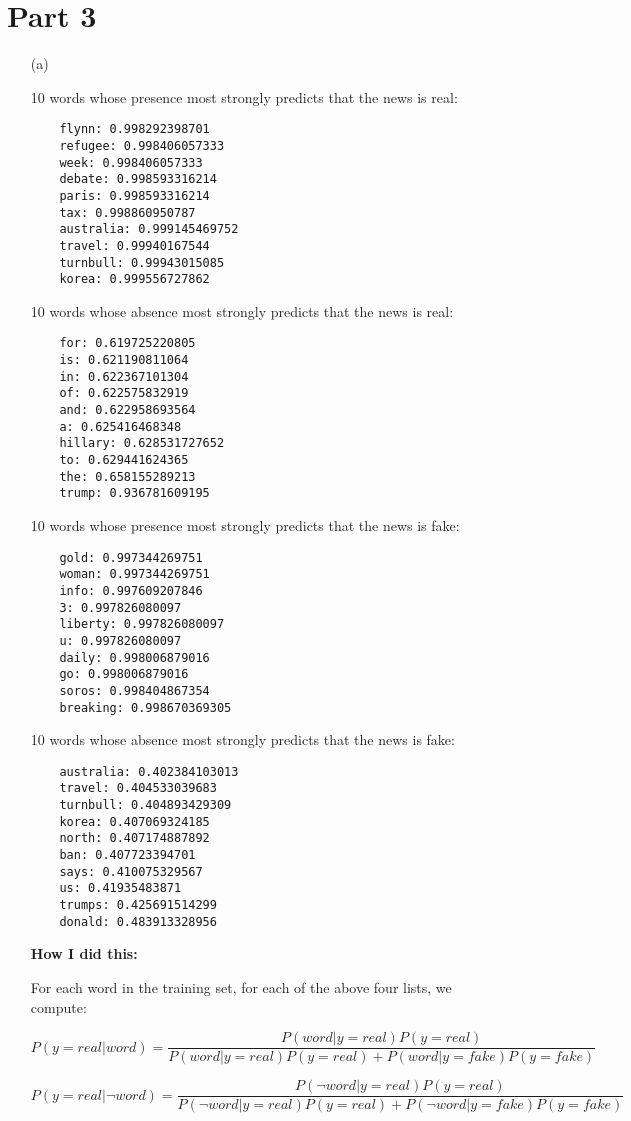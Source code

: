 \documentclass{article}
\begin{document}
\section*{Part 3}
\begin{enumerate}
\item[(a)]

10 words whose presence most strongly predicts that the news is real:
\begin{verbatim}
    flynn: 0.998292398701
    refugee: 0.998406057333
    week: 0.998406057333
    debate: 0.998593316214
    paris: 0.998593316214
    tax: 0.998860950787
    australia: 0.999145469752
    travel: 0.99940167544
    turnbull: 0.99943015085
    korea: 0.999556727862
\end{verbatim}

10 words whose absence most strongly predicts that the news is real:
\begin{verbatim}
    for: 0.619725220805
    is: 0.621190811064
    in: 0.622367101304
    of: 0.622575832919
    and: 0.622958693564
    a: 0.625416468348
    hillary: 0.628531727652
    to: 0.629441624365
    the: 0.658155289213
    trump: 0.936781609195
\end{verbatim}

10 words whose presence most strongly predicts that the news is fake:
\begin{verbatim}
    gold: 0.997344269751
    woman: 0.997344269751
    info: 0.997609207846
    3: 0.997826080097
    liberty: 0.997826080097
    u: 0.997826080097
    daily: 0.998006879016
    go: 0.998006879016
    soros: 0.998404867354
    breaking: 0.998670369305
\end{verbatim}

10 words whose absence most strongly predicts that the news is fake:
\begin{verbatim}
    australia: 0.402384103013
    travel: 0.404533039683
    turnbull: 0.404893429309
    korea: 0.407069324185
    north: 0.407174887892
    ban: 0.407723394701
    says: 0.410075329567
    us: 0.41935483871
    trumps: 0.425691514299
    donald: 0.483913328956
\end{verbatim}


\textbf{How I did this:}

For each word in the training set, for each of the above four lists, we compute:

$$P(y = real|word) = \frac{P(word|y = real)P(y = real)}{P(word|y = real)P(y = real)+P(word|y = fake)P(y = fake)}$$

$$P(y = real|\neg word) = \frac{P(\neg word|y = real)P(y = real)}{P(\neg word|y = real)P(y = real)+P(\neg word|y = fake)P(y = fake)}$$


\end{enumerate}
\end{document}
